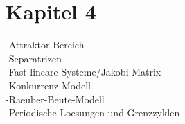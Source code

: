 \section{Kapitel 4}
-Attraktor-Bereich\\
-Separatrizen\\
-Fast lineare Systeme/Jakobi-Matrix\\
-Konkurrenz-Modell\\
-Raeuber-Beute-Modell\\
-Periodische Loesungen und Grenzzyklen\\
